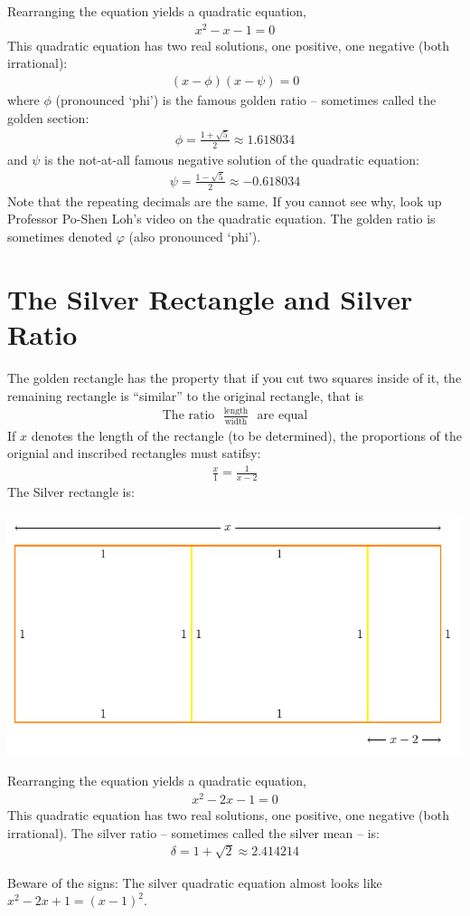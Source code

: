 \documentclass[12pt]{article}
\begin{document}
Rearranging the equation yields a quadratic equation,
\begin{align*}
x^2 - x - 1 = 0
\end{align*}
This quadratic equation has two real solutions, one positive, one negative (both irrational):
\begin{align*}
(x-\phi) (x-\psi) = 0
\end{align*}
where $\phi$ (pronounced `phi') is the famous golden ratio -- sometimes called the golden section:
\begin{align*}
\phi = \frac{1+\sqrt{5}}{2} \approx 1.618034
\end{align*}
and $\psi$ is the not-at-all famous negative solution of the quadratic equation:
\begin{align*}
\psi = \frac{1-\sqrt{5}}{2} \approx -0.618034
\end{align*}
Note that the repeating decimals are the same. If you cannot see why, look up Professor Po-Shen Loh's video on the quadratic equation. The golden ratio is sometimes denoted $\varphi$ (also pronounced `phi'). 

\section{The Silver Rectangle and Silver Ratio}
The golden rectangle has the property that if you cut two squares inside of it, the remaining rectangle is ``similar'' to the original rectangle, that is 
\begin{align*}
\text{The ratio}~~~ \frac{\text{length}}{\text{width}} ~~~\text{are equal}
\end{align*}
If $x$ denotes the length of the rectangle (to be determined), the proportions of the orignial and inscribed rectangles must satifsy:
\begin{align*}
\frac{x}{1} = \frac{1}{x-2}
\end{align*}
The Silver rectangle is:
\begin{center}
\includegraphics{tikz-rectangle-silver}
\end{center}
Rearranging the equation yields a quadratic equation,
\begin{align*}
x^2 - 2x - 1 = 0
\end{align*}
This quadratic equation has two real solutions, one positive, one negative (both irrational). The silver ratio -- sometimes called the silver mean -- is:
\begin{align*}
\delta = 1+\sqrt{2} \approx 2.414214
\end{align*}

Beware of the signs: The silver quadratic equation almost looks like $x^{2}-2x+1=(x-1)^2$. 
\end{document}

